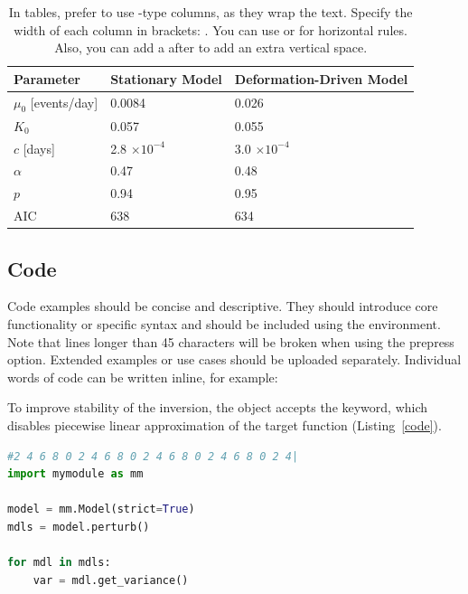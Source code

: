\documentclass[breakmath]{seismica}
\begin{document}
\begin{table}[ht!]

\caption{In tables, prefer to use -type columns, as they wrap the text. Specify the width of each column in brackets: . You can use  or  for horizontal rules. Also, you can add a  after  to add an extra vertical space.} 
\label{tab:etas_parameters}

\begin{tabular}{ m{2.5cm} m{2.5cm} m{2.5cm}  } %
\textbf{Parameter} & \textbf{Stationary Model} & \textbf{Deformation-Driven Model} \\
\hline
\( \mu_0 \) [events/day] & 0.0084 & 0.026 \\
\( K_0 \)                & 0.057  & 0.055 \\
\( c \) [days]           & 2.8 \(\times 10^{-4}\) & 3.0 \(\times 10^{-4}\) \\
\( \alpha \)             & 0.47   & 0.48 \\
\( p \)                  & 0.94   & 0.95 \\
AIC                      & 638    & 634 \\
\end{tabular}
\end{table}

	\subsection{Code}

Code examples should be concise and descriptive. They should introduce core functionality or specific syntax and should be included using the  environment. Note that lines longer than 45 characters will be broken when using the prepress option. Extended examples or use cases should be uploaded separately. Individual words of code can be written inline, for example:

To improve stability of the inversion, the  object accepts the  keyword, which disables piecewise linear approximation of the target function (Listing~\ref{code}).

\begin{lstlisting}[caption=Example use of \code{Model}, label=code, language=Python]
#2 4 6 8 0 2 4 6 8 0 2 4 6 8 0 2 4 6 8 0 2 4|
import mymodule as mm

model = mm.Model(strict=True)
mdls = model.perturb()

for mdl in mdls:
	var = mdl.get_variance()
\end{lstlisting}
\end{document}

